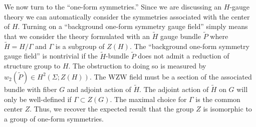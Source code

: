 \documentclass[a4paper,11pt]{article}
\newcommand{\tsf}[1]{\textsf{#1}}
\begin{document}
%
%
%
%
%
%
%
%

We now turn to the ``one-form symmetries.'' Since we are discussing an $H$-gauge theory we can automatically consider the symmetries associated with the center of $H$. Turning on a ``background one-form symmetry gauge field'' simply means that we consider the theory formulated with an 
$\tilde H$ gauge bundle $\tilde P$ where $\tilde H = H/\Gamma$ and $\Gamma$ is a subgroup of $Z(H)$. 
The ``background one-form symmetry gauge field'' is nontrivial if the $\tilde H$-bundle $\tilde P$ does not admit a reduction of structure group to $H$. The obstruction to doing so is measured by $w_2(\tilde P) \in H^2(\Sigma; Z(H))$. The \tsf{WZW} field must be a section of the associated bundle with fiber $G$ and adjoint action of $\tilde H$. The adjoint action of $\tilde H$ on $G$ will only be well-defined if $\Gamma \subset Z(G)$. The maximal choice for $\Gamma$ is the common center $Z$. Thus, we recover the expected result that the group $Z$ is isomorphic to a  group of one-form symmetries. 
\end{document}
